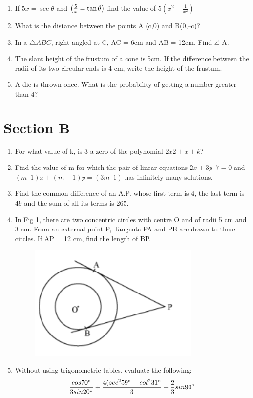\documentclass[journal,12pt,twocolumn]{IEEEtran}
\renewcommand\thesection{\arabic{section}}
\begin{document}
\begin{enumerate}[label=\thesection.\arabic*.,ref=\thesection.\theenumi]
\item  If $5x=\sec\theta$ and $\begin{pmatrix}\frac{5}{x}=\tan\theta\end{pmatrix}$ find the value of $5(x^2-\frac{1}{x^2})$ \\
\item What is the distance between the points A (c,0) and B(0,–c)? \\
\item  In a $\triangle ABC $, right-angled at C, AC = 6cm and AB = 12cm. Find $\angle$ A. \\
\item  The slant height of the frustum of a cone is 5cm. If the difference between the radii of its two circular ends is 4 cm, write the height of the frustum. \\
\item  A die is thrown once. What is the probability of getting a number greater than 4?
\end{enumerate}
\section{Section B}
\renewcommand{\theequation}{\theenumi}
\begin{enumerate}[label=\thesection.\arabic*.,ref=\thesection.\theenumi]
\item  For what value of k, is 3 a zero of the polynomial $2x2+x+k$? \\
\item  Find the value of m for which the pair of linear equations $2x+3y–7=0$ and $(m–1)x+(m+1)y =(3m–1)$ has infinitely many solutions. \\
\item  Find the common difference of an A.P. whose first term is 4, the last term is 49 and the sum of all its terms is 265. \\
\item In Fig \ref{fig3}, there are two concentric circles with centre O and of radii 5 cm and 3 cm. From an external point P, Tangents PA and PB are drawn to these circles. If AP = 12 cm, find the length of BP. \pagebreak
\begin{figure}[h!]
    \centering
    \includegraphics[width=0.5\columnwidth,center]{./fig/3.png}
	\caption{}
	\label{fig3}
 \end{figure}
\item  Without using trigonometric tables, evaluate the following:
\begin{align}
\frac{cos 70\degree}{3 sin 20\degree}+\frac{4(sec^2 59\degree- cot^231\degree}{3}-\frac{2}{3}sin 90\degree \nonumber
\end{align} \\
\end{enumerate}
\end{document}
